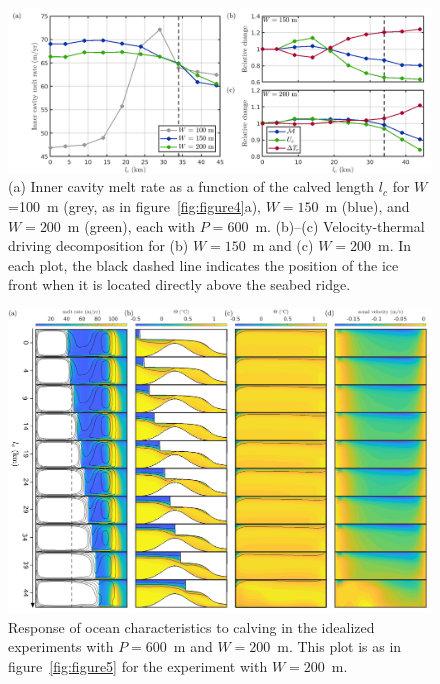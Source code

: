 \documentclass[draft]{agujournal2019}
\begin{document}
\begin{figure}
    \centering
    \includegraphics[width = \textwidth]{../make_figures/plots/figure6.png}
    \caption{(a) Inner cavity melt rate as a function of the calved length $l_c$ for $W$=100~m (grey, as in figure~\ref{fig:figure4}a), $W=150$~m (blue), and $W=200$~m (green), each with $P = 600$~m.  (b)--(c) Velocity-thermal driving decomposition for (b) $W = 150$~m and (c) $W = 200$~m. In each plot, the black dashed line indicates the position of the ice front when it is located directly above the seabed ridge.}
    \label{fig:figure6}
\end{figure}

\begin{figure}
    \centering
    \includegraphics[width = \textwidth]{../make_figures/plots/figure7.pdf}
    \caption{Response of ocean characteristics to calving in the idealized experiments with $P=600$~m and $W=200$~m. This plot is as in figure~\ref{fig:figure5} for the experiment with $W=200$~m.}
    \label{fig:figure7}
\end{figure}
\end{document}
